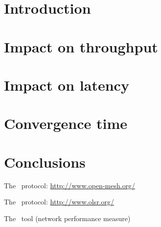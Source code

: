 \documentclass{article}
\begin{document}
\thispagestyle{empty}
\tableofcontents

\clearpage
\setcounter{page}{1}

\section{Introduction} \label{sec:Intro}
\vspace{-3mm}\HRule

    

\section{Impact on throughput} \label{sec:ImpactThroughput}
\vspace{-3mm}\HRule

    

\clearpage
\section{Impact on latency} \label{sec:ImpactLatency}
\vspace{-3mm}\HRule

    

\clearpage
\section{Convergence time} \label{sec:Convergence}
\vspace{-3mm}\HRule

    

\section{Conclusions} \label{sec:Conclusions}
\vspace{-3mm}\HRule

    



\begin{thebibliography}{99}

     The \batman\ protocol:
    \url{http://www.open-mesh.org/}

     The \olsr\ protocol:
    \url{http://www.olsr.org/}

     The \netperf\ tool (network performance
    measure)

%
%

\end{thebibliography}
\end{document}
